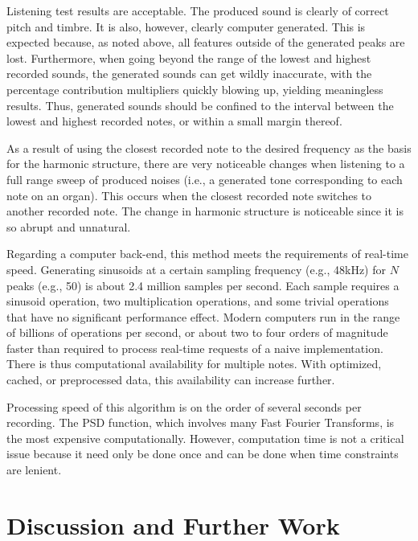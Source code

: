 \documentclass[twocolumn]{article}
\begin{document}
Listening test results are acceptable. The produced sound is clearly of correct pitch and timbre. It is also, however, clearly computer generated. This is expected because, as noted above, all features outside of the generated peaks are lost. Furthermore, when going beyond the range of the lowest and highest recorded sounds, the generated sounds can get wildly inaccurate, with the percentage contribution multipliers quickly blowing up, yielding meaningless results. Thus, generated sounds should be confined to the interval between the lowest and highest recorded notes, or within a small margin thereof.

As a result of using the closest recorded note to the desired frequency as the basis for the harmonic structure, there are very noticeable changes when listening to a full range sweep of produced noises (i.e., a generated tone corresponding to each note on an organ). This occurs when the closest recorded note switches to another recorded note. The change in harmonic structure is noticeable since it is so abrupt and unnatural.

Regarding a computer back-end, this method meets the requirements of real-time speed. Generating sinusoids at a certain sampling frequency (e.g., 48kHz) for $N$ peaks (e.g., 50) is about 2.4 million samples per second. Each sample requires a sinusoid operation, two multiplication operations, and some trivial operations that have no significant performance effect. Modern computers run in the range of billions of operations per second, or about two to four orders of magnitude faster than required to process real-time requests of a naive implementation. There is thus computational availability for multiple notes. With optimized, cached, or preprocessed data, this availability can increase further.

Processing speed of this algorithm is on the order of several seconds per recording. The PSD function, which involves many Fast Fourier Transforms, is the most expensive computationally. However, computation time is not a critical issue because it need only be done once and can be done when time constraints are lenient.

\section{Discussion and Further Work}
\end{document}
